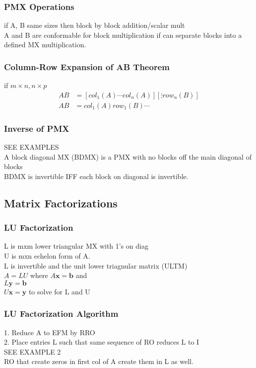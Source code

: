 \documentclass[12pt]{article}
\begin{document}
    \subsubsection{PMX Operations}
        if A, B same sizes then block by block addition/scalar mult \\
        A and B are conformable for block multiplication if can
        separate blocks into a defined MX multiplication.
    \subsubsection{Column-Row Expansion of AB Theorem}
        if $ m \times n,n \times p $ 
        \begin{align*}
            AB &=  [col_1(A) \cdots col_n(A)][\vdots row_n(B)] \\
            AB &= col_1(A)row_1(B)\cdots
        \end{align*}
    \subsubsection{Inverse of PMX}
    SEE EXAMPLES \\
        A block diagonal MX (BDMX) is a PMX with no blocks off
        the main diagonal of blocks \\
        BDMX is invertible IFF each block on diagonal is invertible.
\subsection{Matrix Factorizations}
    \subsubsection{LU Factorization}
        L is mxm lower triangular MX with 1's on diag \\
        U is mxn echelon form of A. \\
        L is invertible and the unit lower triagnular matrix (ULTM) \\
        $ A = LU $ where $ A\bm{x} = \bm{b} $  and \\
        $ L\bm{y} = \bm{b} $  \\
        $ U\bm{x} = \bm{y} $  to solve for L and U 
    \subsubsection{LU Factorization Algorithm}
        1. Reduce A to EFM by RRO \\
        2. Place entries L such that same sequence of RO reduces L to I \\
        SEE EXAMPLE 2 \\
        RO that create zeros in first col of A create them in L as well.
\end{document}

